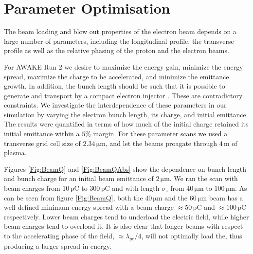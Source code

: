 \documentclass[aps,prstab,reprint,amsmath,amssymb,groupedaddress]{revtex4-1}
\newcommand{\unit}[1]{\,\mathrm{#1}}
\begin{document}
\section{Parameter Optimisation}\label{S:PO}

The beam loading and blow out properties of the electron beam depends on a large number of parameters, including the
longitudinal profile, the transverse profile as well as the relative phasing of the proton and the electron beams.

For AWAKE Run 2 we desire to maximize the energy gain, minimize the energy spread, maximize the charge to be
accelerated, and minimize the emittance growth. In addition, the bunch length should be such that it is possible to
generate and transport by a compact electron injector \cite{adli:2016}. These are contradictory constraints. We
investigate the interdependence of these parameters in our simulation by varying the electron bunch length, its charge,
and initial emittance. The results were quantified in terms of how much of the initial charge retained its initial
emittance within a $5\%$ margin. For these parameter scans we used a transverse grid cell size of $2.34\unit{\mu m}$,
and let the beams proagate through $4\unit{m}$ of plasma.

Figures \ref{Fig:BeamQ} and \ref{Fig:BeamQAbs} show the dependence on bunch length and bunch charge for an initial beam
emittance of $2\unit{\mu m}$. We ran the scan with beam charges from $10\unit{pC}$ to $300\unit{pC}$ and with length
$\sigma_{z}$ from $40\unit{\mu m}$ to $100\unit{\mu m}$. As can be seen from figure \ref{Fig:BeamQ}, both the
$40\unit{\mu m}$ and the $60\unit{\mu m}$ beam has a well defined minimum energy spread with a beam charge
$\approx 50\unit{pC}$ and $\approx 100\unit{pC}$ respectively. Lower beam charges tend to underload the electric field,
while higher beam charges tend to overload it. It is also clear that longer beams with respect to the accelerating phase
of the field, $\approx\lambda_{pe}/4$, will not optimally load the, thus producing a larger spread in energy.
\end{document}
